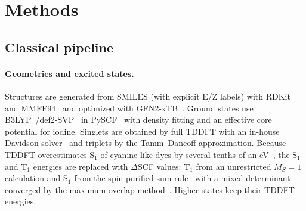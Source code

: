 \documentclass[journal=jctcce,manuscript=article,layout=twocolumn]{achemso}
\begin{document}
\section{Methods}

\subsection{Classical pipeline}

\paragraph{Geometries and excited states.} Structures are generated from SMILES (with explicit E/Z
labels) with RDKit and MMFF94~\cite{Halgren1996} and optimized with GFN2-xTB~\cite{Bannwarth2019}.
Ground states use B3LYP~\cite{Becke1993,Stephens1994}/def2-SVP~\cite{Weigend2005} in
PySCF~\cite{Sun2020} with density fitting and an effective core potential for iodine. Singlets are
obtained by full TDDFT with an in-house Davidson solver~\cite{Stratmann1998} and triplets by the
Tamm--Dancoff approximation. Because TDDFT overestimates S$_1$ of cyanine-like dyes by several tenths of
an eV~\cite{Momeni2015,LeGuennic2015}, the S$_1$ and T$_1$ energies are replaced with $\Delta$SCF
values: T$_1$ from an unrestricted $M_S=1$ calculation and S$_1$ from the spin-purified sum
rule~\cite{Ziegler1977} with a mixed determinant converged by the maximum-overlap
method~\cite{Gilbert2008}. Higher states keep their TDDFT energies.
\end{document}
